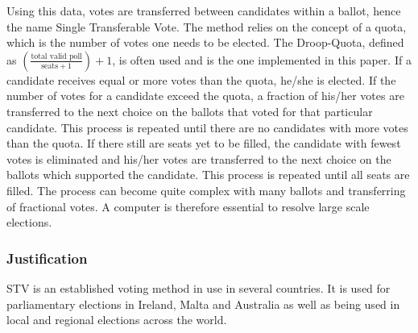 \documentclass[12pt]{article}
\begin{document}
Using this data, votes are transferred between candidates within a ballot, hence the name Single Transferable Vote. The method relies on the concept of a quota, which is the number of votes one needs to be elected. The Droop-Quota, defined as $(\frac{\text{total valid poll}}{\text{seats} + 1})+1$, is often used and is the one implemented in this paper. If a candidate receives equal or more votes than the quota, he/she is elected. If the number of votes for a candidate exceed the quota, a fraction of his/her votes are transferred to the next choice on the ballots that voted for that particular candidate. This process is repeated until there are no candidates with more votes than the quota. If there still are seats yet to be filled, the candidate with fewest votes is eliminated and his/her votes are transferred to the next choice on the ballots which supported the candidate. This process is repeated until all seats are filled. The process can become quite complex with many ballots and transferring of fractional votes. A computer is therefore essential to resolve large scale elections.
\subsubsection{Justification}
STV is an established voting method in use in several countries. It is used for parliamentary elections in Ireland, Malta and Australia as well as being used in local and regional elections across the world.
\end{document}
